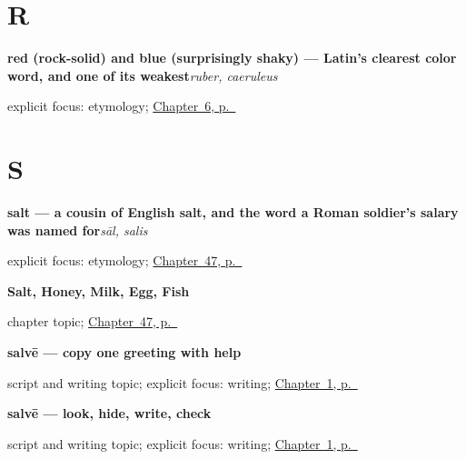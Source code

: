 \section*{R}

\noindent\begin{minipage}[t]{\linewidth}
\raggedright
\textbf{red (rock-solid) and blue (surprisingly shaky) — Latin's clearest color word, and one of its weakest}\enspace\emph{ruber, caeruleus}\par
\footnotesize explicit focus: etymology; \hyperref[ch:la-colours]{Chapter~6, p.~\pageref*{ch:la-colours}}
\end{minipage}\par\smallskip

\section*{S}

\noindent\begin{minipage}[t]{\linewidth}
\raggedright
\textbf{salt — a cousin of English salt, and the word a Roman soldier's salary was named for}\enspace\emph{sāl, salis}\par
\footnotesize explicit focus: etymology; \hyperref[ch:la-mensa]{Chapter~47, p.~\pageref*{ch:la-mensa}}
\end{minipage}\par\smallskip

\noindent\begin{minipage}[t]{\linewidth}
\raggedright
\textbf{Salt, Honey, Milk, Egg, Fish}\par
\footnotesize chapter topic; \hyperref[ch:la-mensa]{Chapter~47, p.~\pageref*{ch:la-mensa}}
\end{minipage}\par\smallskip

\noindent\begin{minipage}[t]{\linewidth}
\raggedright
\textbf{salvē — copy one greeting with help}\par
\footnotesize script and writing topic; explicit focus: writing; \hyperref[ch:greetings]{Chapter~1, p.~\pageref*{ch:greetings}}
\end{minipage}\par\smallskip

\noindent\begin{minipage}[t]{\linewidth}
\raggedright
\textbf{salvē — look, hide, write, check}\par
\footnotesize script and writing topic; explicit focus: writing; \hyperref[ch:greetings]{Chapter~1, p.~\pageref*{ch:greetings}}
\end{minipage}\par\smallskip

